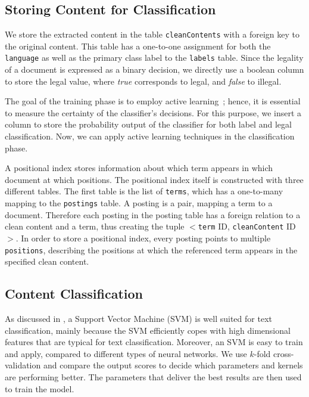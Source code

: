 \subsection{Storing Content for Classification}
We store the extracted content in the table \texttt{cleanContents} with a foreign key to the original content. This table has a one-to-one assignment for both the \texttt{language} as well as the primary class label to the \texttt{labels} table. Since the legality of a document is expressed as a binary decision, we directly use a boolean column to store the legal value, where \emph{true} corresponds to legal, and \emph{false} to illegal.

The goal of the training phase is to employ active learning~\cite{Xu2009}; hence, it is essential to measure the certainty of the classifier's decisions. For this purpose, we insert a column to store the probability output of the classifier for both label and legal classification. Now, we can apply active learning techniques in the classification phase.

A positional index stores information about which term appears in which document at which positions. The positional index itself is constructed with three different tables. The first table is the list of \texttt{terms}, which has a one-to-many mapping to the \texttt{postings} table. A posting is a pair, mapping a term to a document. Therefore each posting in the posting table has a foreign relation to a clean content and a term, thus creating the tuple $<$\texttt{term} ID, \texttt{cleanContent} ID$>$. In order to store a positional index, every posting points to multiple \texttt{positions}, describing the positions at which the referenced term appears in the specified clean content.

%
%
\subsection{Content Classification}
As discussed in \cite{Nabki2017,Verma2013}, a Support Vector Machine (SVM) is well suited for text classification, mainly because the SVM efficiently copes with high dimensional features that are typical for text classification. Moreover, an SVM is easy to train and apply, compared to different types of neural networks. We use $k$-fold cross-validation and compare the output scores to decide which parameters and kernels are performing better. The parameters that deliver the best results are then used to train the model.

